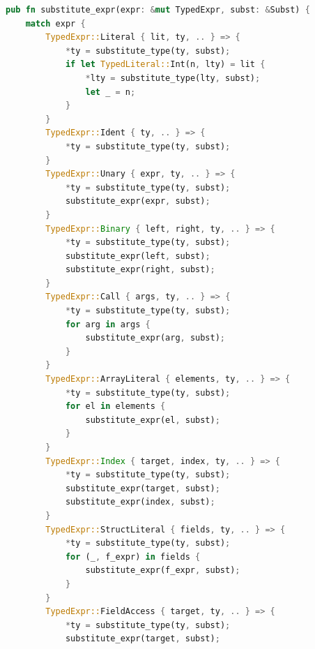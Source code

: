 \begin{lstlisting}[language=Rust, caption={Whole-Program Monomorphization Engine (\texttt{src/opt/monomorphize.rs}).}, label={lst:monomorphize_impl}]
pub fn substitute_expr(expr: &mut TypedExpr, subst: &Subst) {
    match expr {
        TypedExpr::Literal { lit, ty, .. } => {
            *ty = substitute_type(ty, subst);
            if let TypedLiteral::Int(n, lty) = lit {
                *lty = substitute_type(lty, subst);
                let _ = n;
            }
        }
        TypedExpr::Ident { ty, .. } => {
            *ty = substitute_type(ty, subst);
        }
        TypedExpr::Unary { expr, ty, .. } => {
            *ty = substitute_type(ty, subst);
            substitute_expr(expr, subst);
        }
        TypedExpr::Binary { left, right, ty, .. } => {
            *ty = substitute_type(ty, subst);
            substitute_expr(left, subst);
            substitute_expr(right, subst);
        }
        TypedExpr::Call { args, ty, .. } => {
            *ty = substitute_type(ty, subst);
            for arg in args {
                substitute_expr(arg, subst);
            }
        }
        TypedExpr::ArrayLiteral { elements, ty, .. } => {
            *ty = substitute_type(ty, subst);
            for el in elements {
                substitute_expr(el, subst);
            }
        }
        TypedExpr::Index { target, index, ty, .. } => {
            *ty = substitute_type(ty, subst);
            substitute_expr(target, subst);
            substitute_expr(index, subst);
        }
        TypedExpr::StructLiteral { fields, ty, .. } => {
            *ty = substitute_type(ty, subst);
            for (_, f_expr) in fields {
                substitute_expr(f_expr, subst);
            }
        }
        TypedExpr::FieldAccess { target, ty, .. } => {
            *ty = substitute_type(ty, subst);
            substitute_expr(target, subst);

\end{lstlisting}
